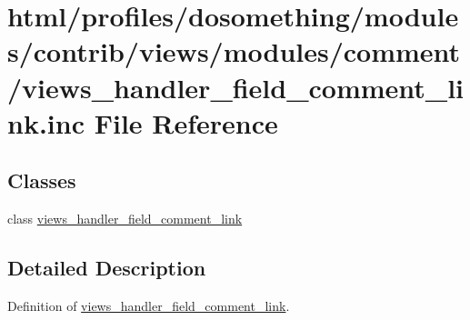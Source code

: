 \hypertarget{views__handler__field__comment__link_8inc}{
\section{html/profiles/dosomething/modules/contrib/views/modules/comment/views\_\-handler\_\-field\_\-comment\_\-link.inc File Reference}
\label{views__handler__field__comment__link_8inc}
}
\subsection*{Classes}
\begin{DoxyCompactItemize}
\item 
class \hyperlink{classviews__handler__field__comment__link}{views\_\-handler\_\-field\_\-comment\_\-link}
\end{DoxyCompactItemize}


\subsection{Detailed Description}
Definition of \hyperlink{classviews__handler__field__comment__link}{views\_\-handler\_\-field\_\-comment\_\-link}. 